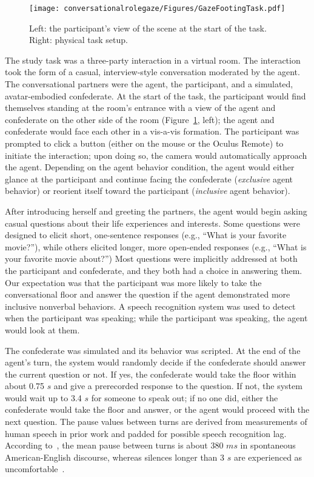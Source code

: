 \begin{figure}
\centering
\texttt{[image: conversationalrolegaze/Figures/GazeFootingTask.pdf]}
\caption{Left: the participant's view of the scene at the start of the task. Right: physical task setup.}
\label{fig:GazeFootingTask}
\end{figure}

The study task was a three-party interaction in a virtual room. The interaction took the form of a casual, interview-style conversation moderated by the agent. The conversational partners were the agent, the participant, and a simulated, avatar-embodied confederate. At the start of the task, the participant would find themselves standing at the room's entrance with a view of the agent and confederate on the other side of the room (Figure~\ref{fig:GazeFootingTask}, left); the agent and confederate would face each other in a vis-a-vis formation. The participant was prompted to click a button (either on the mouse or the Oculus Remote) to initiate the interaction; upon doing so, the camera would automatically approach the agent. Depending on the agent behavior condition, the agent would either glance at the participant and continue facing the confederate (\emph{exclusive} agent behavior) or reorient itself toward the participant (\emph{inclusive} agent behavior).

After introducing herself and greeting the partners, the agent would begin asking casual questions about their life experiences and interests. Some questions were designed to elicit short, one-sentence responses (e.g., ``What is your favorite movie?''), while others elicited longer, more open-ended responses (e.g., ``What is your favorite movie about?'') Most questions were implicitly addressed at both the participant and confederate, and they both had a choice in answering them. Our expectation was that the participant was more likely to take the conversational floor and answer the question if the agent demonstrated more inclusive nonverbal behaviors. A speech recognition system was used to detect when the participant was speaking; while the participant was speaking, the agent would look at them.

The confederate was simulated and its behavior was scripted. At the end of the agent's turn, the system would randomly decide if the confederate should answer the current question or not. If yes, the confederate would take the floor within about 0.75 $s$ and give a prerecorded response to the question. If not, the system would wait up to 3.4 $s$ for someone to speak out; if no one did, either the confederate would take the floor and answer, or the agent would proceed with the next question. The pause values between turns are derived from measurements of human speech in prior work and padded for possible speech recognition lag. According to~\citet{weilhammer2003durational}, the mean pause between turns is about 380 $ms$ in spontaneous American-English discourse, whereas silences longer than 3 $s$ are experienced as uncomfortable~\citep{mclaughlin1982awkward}.

